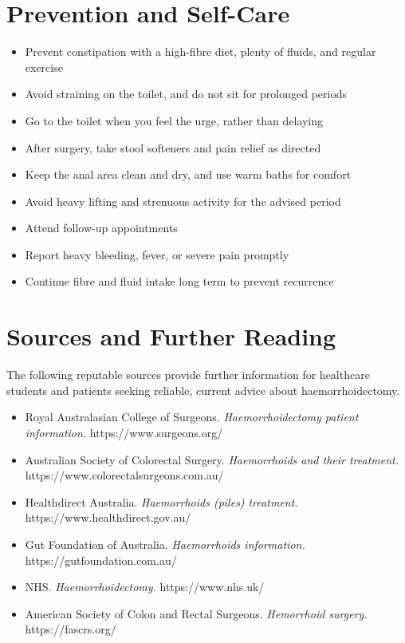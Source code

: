 \section*{Prevention and Self-Care}
\begin{itemize}
    \item Prevent constipation with a high-fibre diet, plenty of fluids, and regular exercise
    \item Avoid straining on the toilet, and do not sit for prolonged periods
    \item Go to the toilet when you feel the urge, rather than delaying
    \item After surgery, take stool softeners and pain relief as directed
    \item Keep the anal area clean and dry, and use warm baths for comfort
    \item Avoid heavy lifting and strenuous activity for the advised period
    \item Attend follow-up appointments
    \item Report heavy bleeding, fever, or severe pain promptly
    \item Continue fibre and fluid intake long term to prevent recurrence
\end{itemize}

\section*{Sources and Further Reading}
The following reputable sources provide further information for healthcare students and patients seeking reliable, current advice about haemorrhoidectomy.

\begin{itemize}
    \item Royal Australasian College of Surgeons. \textit{Haemorrhoidectomy patient information.} https://www.surgeons.org/
    \item Australian Society of Colorectal Surgery. \textit{Haemorrhoids and their treatment.} https://www.colorectalsurgeons.com.au/
    \item Healthdirect Australia. \textit{Haemorrhoids (piles) treatment.} https://www.healthdirect.gov.au/
    \item Gut Foundation of Australia. \textit{Haemorrhoids information.} https://gutfoundation.com.au/
    \item NHS. \textit{Haemorrhoidectomy.} https://www.nhs.uk/
    \item American Society of Colon and Rectal Surgeons. \textit{Hemorrhoid surgery.} https://fascrs.org/
\end{itemize}
